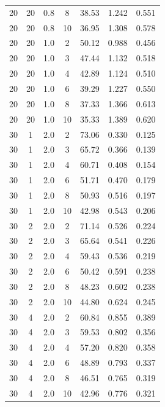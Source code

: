 \documentclass[11pt,a4paper]{article}
\begin{document}
\begin{longtable}{ccccccc}
        20 &  20  &  0.8  & 8 & 38.53 & 1.242 & 0.551 \\
        20 &  20  &  0.8  & 10 & 36.95 & 1.308 & 0.578 \\
        \midrule
        20 &  20  &  1.0  & 2 & 50.12 & 0.988 & 0.456 \\
        20 &  20  &  1.0  & 3 & 47.44 & 1.132 & 0.518 \\
        20 &  20  &  1.0  & 4 & 42.89 & 1.124 & 0.510 \\
        20 &  20  &  1.0  & 6 & 39.29 & 1.227 & 0.550 \\
        20 &  20  &  1.0  & 8 & 37.33 & 1.366 & 0.613 \\
        20 &  20  &  1.0  & 10 & 35.33 & 1.389 & 0.620 \\
        \midrule
        \midrule
        30 &  1  &  2.0  & 2 & 73.06 & 0.330 & 0.125 \\
        30 &  1  &  2.0  & 3 & 65.72 & 0.366 & 0.139 \\
        30 &  1  &  2.0  & 4 & 60.71 & 0.408 & 0.154 \\
        30 &  1  &  2.0  & 6 & 51.71 & 0.470 & 0.179 \\
        30 &  1  &  2.0  & 8 & 50.93 & 0.516 & 0.197 \\
        30 &  1  &  2.0  & 10 & 42.98 & 0.543 & 0.206 \\
        \midrule
        30 &  2  &  2.0  & 2 & 71.14 & 0.526 & 0.224 \\
        30 &  2  &  2.0  & 3 & 65.64 & 0.541 & 0.226 \\
        30 &  2  &  2.0  & 4 & 59.43 & 0.536 & 0.219 \\
        30 &  2  &  2.0  & 6 & 50.42 & 0.591 & 0.238 \\
        30 &  2  &  2.0  & 8 & 48.23 & 0.602 & 0.238 \\
        30 &  2  &  2.0  & 10 & 44.80 & 0.624 & 0.245 \\
        \midrule
        30 &  4  &  2.0  & 2 & 60.84 & 0.855 & 0.389 \\
        30 &  4  &  2.0  & 3 & 59.53 & 0.802 & 0.356 \\
        30 &  4  &  2.0  & 4 & 57.20 & 0.820 & 0.358 \\
        30 &  4  &  2.0  & 6 & 48.89 & 0.793 & 0.337 \\
        30 &  4  &  2.0  & 8 & 46.51 & 0.765 & 0.319 \\
        30 &  4  &  2.0  & 10 & 42.96 & 0.776 & 0.321 \\
        \midrule

\end{longtable}
\end{document}
